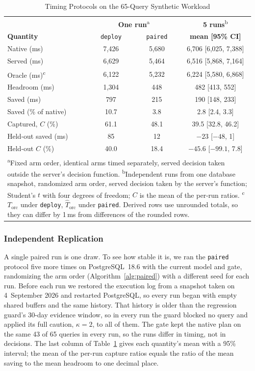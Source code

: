 \documentclass[conference]{IEEEtran}
\begin{document}
\begin{table}[t]
\caption{Timing Protocols on the 65-Query Synthetic Workload}
\label{tab:paired}
\centering
\footnotesize
\setlength{\tabcolsep}{3pt}
\begin{tabular}{|l|c|c|c|}
\hline
 & \multicolumn{2}{c|}{\textbf{One run}\textsuperscript{a}} &
  \textbf{5 runs}\textsuperscript{b} \\
\textbf{Quantity} & \texttt{deploy} & \texttt{paired} & \textbf{mean [95\% CI]} \\
\hline
Native (ms) & 7,426 & 5,680 & 6,706 [6,025, 7,388] \\
Served (ms) & 6,629 & 5,464 & 6,516 [5,868, 7,164] \\
Oracle (ms)\textsuperscript{c} & 6,122 & 5,232 & 6,224 [5,580, 6,868] \\
\hline
Headroom (ms) & 1,304 & 448 & 482 [413, 552] \\
Saved (ms) & 797 & 215 & 190 [148, 233] \\
Saved (\% of native) & 10.7 & 3.8 & 2.8 [2.4, 3.3] \\
Captured, $C$ (\%) & 61.1 & 48.1 & 39.5 [32.8, 46.2] \\
\hline
Held-out saved (ms) & 85 & 12 & $-23$ [$-48$, 1] \\
Held-out $C$ (\%) & 40.0 & 18.4 & $-45.6$ [$-99.1$, 7.8] \\
\hline
\multicolumn{4}{p{0.94\columnwidth}}{\scriptsize \textsuperscript{a}Fixed arm
order, identical arms timed separately, served decision taken outside the
server's decision function. \textsuperscript{b}Independent runs from one
database snapshot, randomized arm order, served decision taken by the server's
function; Student's $t$ with four degrees of freedom; $C$ is the mean of the
per-run ratios. \textsuperscript{c}$T_{\mathrm{orc}}$ under \texttt{deploy},
$\widehat{T}_{\mathrm{orc}}$ under \texttt{paired}. Derived rows use unrounded
totals, so they can differ by 1\,ms from differences of the rounded rows.}
\end{tabular}
\end{table}

\subsubsection{Independent Replication}
\label{sec:replication}
A single paired run is one draw. To see how stable it is, we ran the
\texttt{paired} protocol five more times on PostgreSQL~18.6 with the current
model and gate, randomizing the arm order (Algorithm~\ref{alg:paired}) with a
different seed for each run. Before each run we restored the execution log
from a snapshot taken on 4~September 2026 and restarted PostgreSQL, so every
run began with empty shared buffers and the same history. That history is
older than the regression guard's 30-day evidence window, so in every run the
guard blocked no query and applied its full caution, $\kappa = 2$, to all of
them. The gate kept the native plan on the same 43 of 65 queries in every run,
so the runs differ in timing, not in decisions. The last column of
Table~\ref{tab:paired} gives each quantity's mean with a 95\% interval; the
mean of the per-run capture ratios equals the ratio of the mean saving to the
mean headroom to one decimal place.
\end{document}
